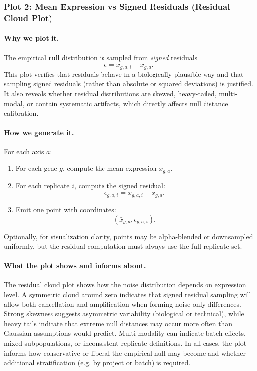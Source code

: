 \documentclass{article}
\begin{document}
\subsubsection{Plot 2: Mean Expression vs Signed Residuals (Residual Cloud Plot)}

\paragraph{Why we plot it.}
The empirical null distribution is sampled from \emph{signed} residuals
\[
\epsilon = x_{g,a,i} - \bar{x}_{g,a}.
\]
This plot verifies that residuals behave in a biologically plausible way and that sampling signed residuals (rather than absolute or squared deviations) is justified. It also reveals whether residual distributions are skewed, heavy-tailed, multi-modal, or contain systematic artifacts, which directly affects null distance calibration.

\paragraph{How we generate it.}
For each axis $a$:
\begin{enumerate}
\item For each gene $g$, compute the mean expression $\bar{x}_{g,a}$.
\item For each replicate $i$, compute the signed residual:
\[
\epsilon_{g,a,i} = x_{g,a,i} - \bar{x}_{g,a}.
\]
\item Emit one point with coordinates:
\[
(\bar{x}_{g,a}, \epsilon_{g,a,i}).
\]
\end{enumerate}
Optionally, for visualization clarity, points may be alpha-blended or downsampled uniformly, but the residual computation must always use the full replicate set.

\paragraph{What the plot shows and informs about.}
The residual cloud plot shows how the noise distribution depends on expression level. A symmetric cloud around zero indicates that signed residual sampling will allow both cancellation and amplification when forming noise-only differences. Strong skewness suggests asymmetric variability (biological or technical), while heavy tails indicate that extreme null distances may occur more often than Gaussian assumptions would predict. Multi-modality can indicate batch effects, mixed subpopulations, or inconsistent replicate definitions. In all cases, the plot informs how conservative or liberal the empirical null may become and whether additional stratification (e.g. by project or batch) is required.
\end{document}
